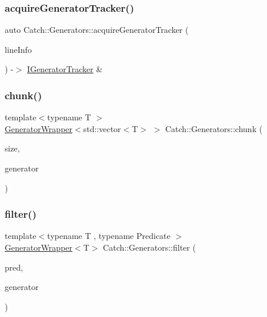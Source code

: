 \subsubsection{\texorpdfstring{acquire\+Generator\+Tracker()}{acquireGeneratorTracker()}}
{\footnotesize\ttfamily auto Catch\+::\+Generators\+::acquire\+Generator\+Tracker (\begin{DoxyParamCaption}\item[{\mbox{\hyperlink{struct_catch_1_1_source_line_info}{Source\+Line\+Info}} const \&}]{line\+Info }\end{DoxyParamCaption}) -\/$>$  \mbox{\hyperlink{struct_catch_1_1_i_generator_tracker}{I\+Generator\+Tracker}} \&}

\mbox{\label{namespace_catch_1_1_generators_a0ac5eeee0354973c318f62d0937a7981}} 
\subsubsection{\texorpdfstring{chunk()}{chunk()}}
{\footnotesize\ttfamily template$<$typename T $>$ \\
\mbox{\hyperlink{class_catch_1_1_generators_1_1_generator_wrapper}{Generator\+Wrapper}}$<$std\+::vector$<$T$>$ $>$ Catch\+::\+Generators\+::chunk (\begin{DoxyParamCaption}\item[{size\+\_\+t}]{size,  }\item[{\mbox{\hyperlink{class_catch_1_1_generators_1_1_generator_wrapper}{Generator\+Wrapper}}$<$ T $>$ \&\&}]{generator }\end{DoxyParamCaption})}

\mbox{\label{namespace_catch_1_1_generators_afd87f4cbf259f2252aee164d6905b18b}} 
\subsubsection{\texorpdfstring{filter()}{filter()}}
{\footnotesize\ttfamily template$<$typename T , typename Predicate $>$ \\
\mbox{\hyperlink{class_catch_1_1_generators_1_1_generator_wrapper}{Generator\+Wrapper}}$<$T$>$ Catch\+::\+Generators\+::filter (\begin{DoxyParamCaption}\item[{Predicate \&\&}]{pred,  }\item[{\mbox{\hyperlink{class_catch_1_1_generators_1_1_generator_wrapper}{Generator\+Wrapper}}$<$ T $>$ \&\&}]{generator }\end{DoxyParamCaption})}

